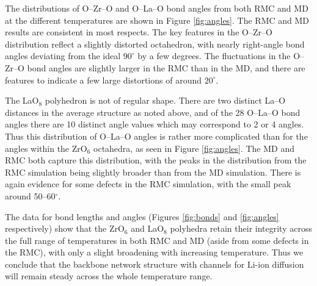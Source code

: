 \documentclass[twoside,twocolumn,9pt]{article}
\begin{document}
The distributions of  O--Zr--O and O--La--O bond angles from both RMC and MD at the different temperatures are shown in Figure \ref{fig:angles}. The RMC and MD results are consistent in most respects. The key features in the O--Zr--O distribution reflect a slightly distorted octahedron, with nearly right-angle bond angles deviating from the ideal $90^\circ$ by a few degrees. The fluctuations in the O--Zr--O bond angles are slightly larger in the RMC than in the MD, and there are features to indicate a few large distortions of around  $20^\circ$.

The LaO$_8$ polyhedron is not of regular shape. There are two distinct La--O distances in the average structure as noted above, and of the 28 O--La--O bond angles there are 10 distinct angle values which may correspond to 2 or 4 angles. Thus this distribution of O--La--O angles is rather more complicated than for the angles within the ZrO$_6$ octahedra, as seen in Figure \ref{fig:angles}. The MD and RMC both capture this distribution, with the peaks in the distribution from the RMC simulation being slightly broader than from the MD simulation. There is again evidence for some defects in the RMC simulation, with the small peak around 50--60$^\circ$.

The data for bond lengths and angles (Figures \ref{fig:bonds} and \ref{fig:angles} respectively) show that the ZrO$_6$ and LaO$_8$ polyhedra retain their integrity across the full range of temperatures in both RMC and MD (aside from some defects in the RMC), with only a slight broadening with increasing temperature. Thus we conclude that the backbone network structure with channels for Li-ion diffusion will remain steady across the whole temperature range.


%
\end{document}
